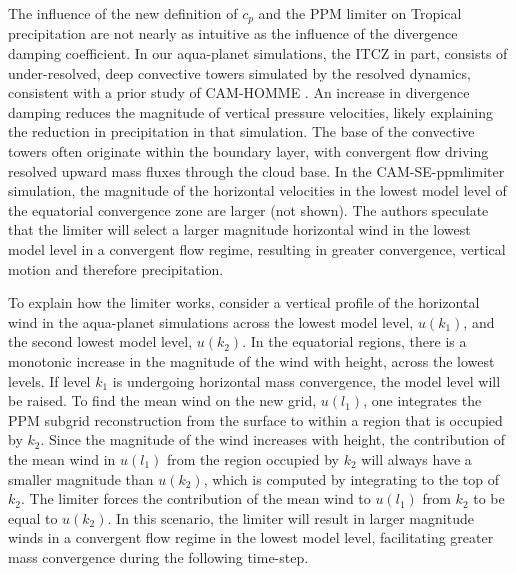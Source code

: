 The influence of the new definition of $c_p$ and the PPM limiter on Tropical precipitation are not nearly as intuitive as the influence of the divergence damping coefficient. In our aqua-planet simulations, the ITCZ in part, consists of under-resolved, deep convective towers simulated by the resolved dynamics, consistent with a prior study of CAM-HOMME \citep{HR2017JCLIM}. An increase in divergence damping reduces the magnitude of vertical pressure velocities, likely explaining the reduction in precipitation in that simulation. The base of the convective towers often originate within the boundary layer, with convergent flow driving resolved upward mass fluxes through the cloud base. In the CAM-SE-ppmlimiter simulation, the magnitude of the horizontal velocities in the lowest model level of the equatorial convergence zone are larger (not shown). The authors speculate that the limiter will select a larger magnitude horizontal wind in the lowest model level in a convergent flow regime, resulting in greater convergence, vertical motion and therefore precipitation. 

To explain how the limiter works, consider a vertical profile of the horizontal wind in the aqua-planet simulations across the lowest model level, $u(k_1)$, and the second lowest model level, $u(k_2)$. In the equatorial regions, there is a monotonic increase in the magnitude of the wind with height, across the lowest levels. If level $k_1$ is undergoing horizontal mass convergence, the model level will be raised. To find the mean wind on the new grid, $u(l_1)$, one integrates the PPM subgrid reconstruction from the surface to within a region that is occupied by $k_2$. Since the magnitude of the wind increases with height, the contribution of the mean wind in $u(l_1)$ from the region occupied by $k_2$ will always have a smaller magnitude than $u(k_2)$, which is computed by integrating to the top of $k_2$. The limiter forces the contribution of the mean wind to $u(l_1)$ from $k_2$ to be equal to $u(k_2)$. In this scenario, the limiter will result in larger magnitude winds in a convergent flow regime in the lowest model level, facilitating greater mass convergence during the following time-step.    

